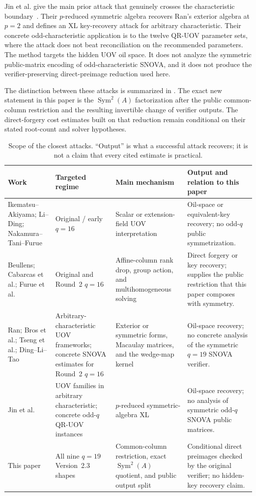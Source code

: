 \documentclass[11pt]{article}
\newcommand{\Sym}{\operatorname{Sym}}
\newcommand{\SNOVA}{\textsf{SNOVA}}
\begin{document}
Jin et al. give the main prior attack that genuinely crosses the
characteristic boundary~\cite{JinEtAl2026}.  Their $p$-reduced symmetric
algebra recovers Ran's exterior algebra at $p=2$ and defines an XL
key-recovery attack for arbitrary characteristic.  Their concrete
odd-characteristic application is to the twelve QR-UOV parameter sets, where
the attack does not beat reconciliation on the recommended parameters.  The
method targets the hidden UOV oil space.  It does not analyze the symmetric
public-matrix encoding of odd-characteristic \SNOVA{}, and it does not produce
the verifier-preserving direct-preimage reduction used here.

The distinction between these attacks is summarized in
.  The exact new statement in this paper is the
$\Sym^2(A)$ factorization after the public common-column restriction and the
resulting invertible change of verifier outputs.  The direct-forgery cost
estimates built on that reduction remain conditional on their stated
root-count and solver hypotheses.

\begin{table}[H]
\centering
\caption{Scope of the closest attacks.  ``Output'' is what a successful attack
recovers; it is not a claim that every cited estimate is practical.}
\label{tab:prior-attacks}
\footnotesize
\renewcommand{\arraystretch}{1.08}
\begin{tabularx}{0.98\textwidth}{@{}>{\raggedright\arraybackslash}p{}>{\raggedright\arraybackslash}p{}>{\raggedright\arraybackslash}p{}>{\raggedright\arraybackslash}X@{}}
\toprule
Work & Targeted regime & Main mechanism & Output and relation to this paper\\
\midrule
Ikematsu--Akiyama; Li--Ding; Nakamura--Tani--Furue
& Original / early $q=16$
& Scalar or extension-field UOV interpretation
& Oil-space or equivalent-key recovery; no odd-$q$ public symmetrization.\\
Beullens; Cabarcas et al.; Furue et al.
& Original and Round~2 $q=16$
& Affine-column rank drop, group action, and multihomogeneous solving
& Direct forgery or key recovery; supplies the public restriction that this paper composes with symmetry.\\
Ran; Bros et al.; Tseng et al.; Ding--Li--Tao
& Arbitrary-characteristic UOV frameworks; concrete SNOVA estimates for Round~2 $q=16$
& Exterior or symmetric forms, Macaulay matrices, and the wedge-map kernel
& Oil-space recovery; no concrete analysis of the symmetric $q=19$ SNOVA verifier.\\
Jin et al.
& UOV families in arbitrary characteristic; concrete odd-$q$ QR-UOV instances
& $p$-reduced symmetric-algebra XL
& Oil-space recovery; no analysis of symmetric odd-$q$ SNOVA public matrices.\\
This paper
& All nine $q=19$ Version~2.3 shapes
& Common-column restriction, exact $\Sym^2(A)$ quotient, and public output split
& Conditional direct preimages checked by the original verifier; no hidden-key recovery claim.\\
\bottomrule
\end{tabularx}
\end{table}
\end{document}
